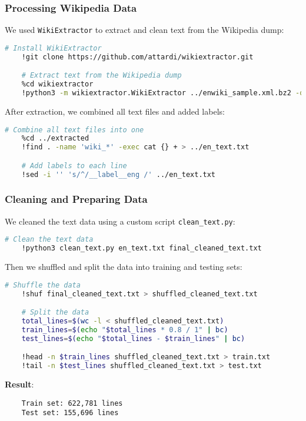 \documentclass{beamer}
\begin{document}
\begin{frame}[fragile]
    \frametitle{Processing Wikipedia Data}
    We used \texttt{WikiExtractor} to extract and clean text from the Wikipedia dump:

    \begin{lstlisting}[language=bash]
    # Install WikiExtractor
    !git clone https://github.com/attardi/wikiextractor.git

    # Extract text from the Wikipedia dump
    %cd wikiextractor
    !python3 -m wikiextractor.WikiExtractor ../enwiki_sample.xml.bz2 -o ../extracted -b 100M --processes 4
    \end{lstlisting}

    After extraction, we combined all text files and added labels:

    \begin{lstlisting}[language=bash]
    # Combine all text files into one
    %cd ../extracted
    !find . -name 'wiki_*' -exec cat {} + > ../en_text.txt

    # Add labels to each line
    !sed -i '' 's/^/__label__eng /' ../en_text.txt
    \end{lstlisting}
\end{frame}

\begin{frame}[fragile]
    \frametitle{Cleaning and Preparing Data}
    We cleaned the text data using a custom script \texttt{clean_text.py}:

    \begin{lstlisting}[language=bash]
    # Clean the text data
    !python3 clean_text.py en_text.txt final_cleaned_text.txt
    \end{lstlisting}

    Then we shuffled and split the data into training and testing sets:

    \begin{lstlisting}[language=bash]
    # Shuffle the data
    !shuf final_cleaned_text.txt > shuffled_cleaned_text.txt

    # Split the data
    total_lines=$(wc -l < shuffled_cleaned_text.txt)
    train_lines=$(echo "$total_lines * 0.8 / 1" | bc)
    test_lines=$(echo "$total_lines - $train_lines" | bc)

    !head -n $train_lines shuffled_cleaned_text.txt > train.txt
    !tail -n $test_lines shuffled_cleaned_text.txt > test.txt
    \end{lstlisting}

    \textbf{Result}:
    \begin{lstlisting}
    Train set: 622,781 lines
    Test set: 155,696 lines
    \end{lstlisting}
\end{frame}
\end{document}

